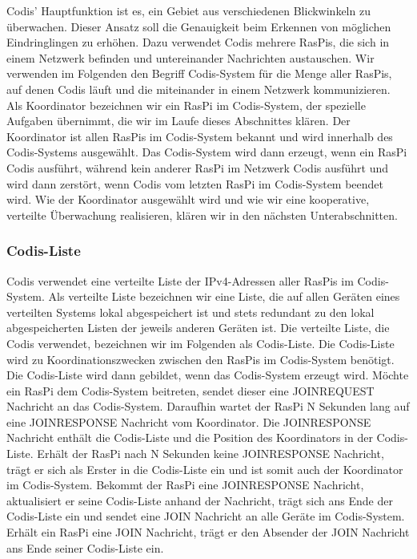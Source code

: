 \documentclass[journal]{IEEEtran}
\begin{document}
Codis' Hauptfunktion ist es, ein Gebiet aus verschiedenen Blickwinkeln zu überwachen. Dieser Ansatz soll die Genauigkeit beim Erkennen von möglichen Eindringlingen zu erhöhen. Dazu verwendet Codis mehrere RasPis, die sich in einem Netzwerk befinden und untereinander Nachrichten austauschen. Wir verwenden im Folgenden den Begriff Codis-System für die Menge aller RasPis, auf denen Codis läuft und die miteinander in einem Netzwerk kommunizieren. Als Koordinator bezeichnen wir ein RasPi im Codis-System, der spezielle Aufgaben übernimmt, die wir im Laufe dieses Abschnittes klären. Der Koordinator ist allen RasPis im Codis-System bekannt und wird innerhalb des Codis-Systems ausgewählt. Das Codis-System wird dann erzeugt, wenn ein RasPi Codis ausführt, während kein anderer RasPi im Netzwerk Codis ausführt und wird dann zerstört, wenn Codis vom letzten RasPi im Codis-System beendet wird. Wie der Koordinator ausgewählt wird und wie wir eine kooperative, verteilte Überwachung realisieren, klären wir in den nächsten Unterabschnitten.

\subsubsection{Codis-Liste}

Codis verwendet eine verteilte Liste der IPv4-Adressen aller RasPis im Codis-System. Als verteilte Liste bezeichnen wir eine Liste, die auf allen Geräten eines verteilten Systems lokal abgespeichert ist und stets redundant zu den lokal abgespeicherten Listen der jeweils anderen Geräten ist. Die verteilte Liste, die Codis verwendet, bezeichnen wir im Folgenden als Codis-Liste. Die Codis-Liste wird zu Koordinationszwecken zwischen den RasPis im Codis-System benötigt.
Die Codis-Liste wird dann gebildet, wenn das Codis-System erzeugt wird. Möchte ein RasPi dem Codis-System beitreten, sendet dieser eine \MakeUppercase{joinrequest} Nachricht an das Codis-System. Daraufhin wartet der RasPi N Sekunden lang auf eine \MakeUppercase{joinresponse} Nachricht vom Koordinator. Die \MakeUppercase{joinresponse} Nachricht enthält die Codis-Liste und die Position des Koordinators in der Codis-Liste. Erhält der RasPi nach N Sekunden keine \MakeUppercase{joinresponse} Nachricht, trägt er sich als Erster in die Codis-Liste ein und ist somit auch der Koordinator im Codis-System. Bekommt der RasPi eine \MakeUppercase{joinresponse} Nachricht, aktualisiert er seine Codis-Liste anhand der Nachricht, trägt sich ans Ende der Codis-Liste ein und sendet eine \MakeUppercase{join} Nachricht an alle Geräte im Codis-System. Erhält ein RasPi eine \MakeUppercase{join} Nachricht, trägt er den Absender der \MakeUppercase{join} Nachricht ans Ende seiner Codis-Liste ein.
\end{document}
